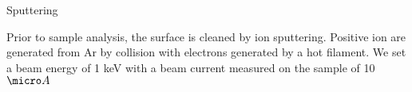 \begin{frame}{Sputtering}

Prior to sample analysis, the surface is cleaned by ion sputtering. Positive ion are generated from Ar by collision with electrons generated by a hot filament. We set a beam energy of 1 keV with a beam current measured on the sample of 10 $\micro A$
    
\end{frame}